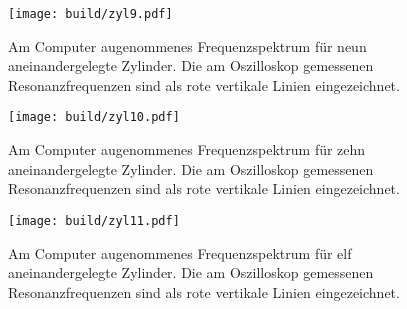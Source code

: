 \begin{figure}
  \centering
  \texttt{[image: build/zyl9.pdf]}
  \caption{Am Computer augenommenes Frequenzspektrum für neun aneinandergelegte
  Zylinder. Die am Oszilloskop gemessenen Resonanzfrequenzen sind als rote vertikale
  Linien eingezeichnet.}
  \label{fig:zyl9}
\end{figure}

\begin{figure}
  \centering
  \texttt{[image: build/zyl10.pdf]}
  \caption{Am Computer augenommenes Frequenzspektrum für zehn aneinandergelegte
  Zylinder. Die am Oszilloskop gemessenen Resonanzfrequenzen sind als rote vertikale
  Linien eingezeichnet.}
  \label{fig:zyl10}
\end{figure}

\begin{figure}
  \centering
  \texttt{[image: build/zyl11.pdf]}
  \caption{Am Computer augenommenes Frequenzspektrum für elf aneinandergelegte
  Zylinder. Die am Oszilloskop gemessenen Resonanzfrequenzen sind als rote vertikale
  Linien eingezeichnet.}
  \label{fig:zyl11}
\end{figure}
